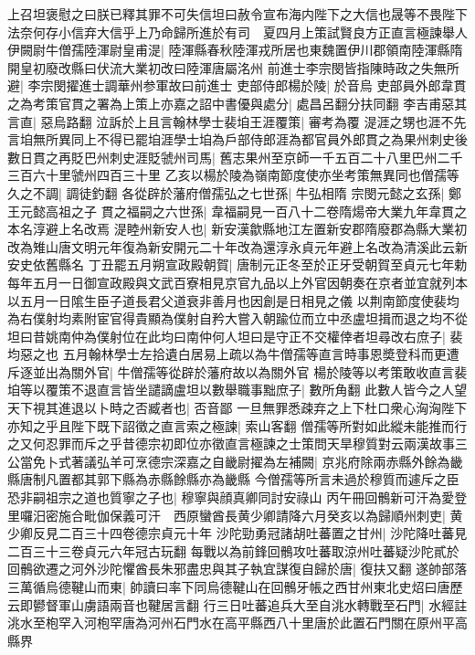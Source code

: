 上召坦褒慰之曰朕已釋其罪不可失信坦曰赦令宣布海内陛下之大信也晟等不畏陛下法奈何存小信弃大信乎上乃命歸所進於有司　夏四月上策試賢良方正直言極諫舉人伊闕尉牛僧孺陸渾尉皇甫湜|{
	陸渾縣春秋陸渾戎所居也東魏置伊川郡領南陸渾縣隋開皇初廢改縣曰伏流大業初改曰陸渾唐屬洺州}
前進士李宗閔皆指陳時政之失無所避|{
	李宗閔擢進士調華州参軍故曰前進士}
吏部侍郎楊於陵|{
	於音烏}
吏部員外郎韋貫之為考策官貫之署為上策上亦嘉之詔中書優與處分|{
	處昌呂翻分扶同翻}
李吉甫惡其言直|{
	惡烏路翻}
泣訴於上且言翰林學士裴垍王涯覆策|{
	審考為覆}
湜涯之甥也涯不先言垍無所異同上不得已罷垍涯學士垍為戶部侍郎涯為都官員外郎貫之為果州刺史後數日貫之再貶巴州刺史涯貶虢州司馬|{
	舊志果州至京師一千五百二十八里巴州二千三百六十里虢州四百三十里}
乙亥以楊於陵為嶺南節度使亦坐考策無異同也僧孺等久之不調|{
	調徒釣翻}
各從辟於藩府僧孺弘之七世孫|{
	牛弘相隋}
宗閔元懿之玄孫|{
	鄭王元懿高祖之子}
貫之福嗣之六世孫|{
	韋福嗣見一百八十二卷隋煬帝大業九年韋貫之本名淳避上名改焉}
湜睦州新安人也|{
	新安漢歙縣地江左置新安郡隋廢郡為縣大業初改為雉山唐文明元年復為新安開元二十年改為還淳永貞元年避上名改為清溪此云新安史依舊縣名}
丁丑罷五月朔宣政殿朝賀|{
	唐制元正冬至於正牙受朝賀至貞元七年勅每年五月一日御宣政殿與文武百寮相見京官九品以上外官因朝奏在京者並宜就列本以五月一日隂生臣子道長君父道衰非善月也因創是日相見之儀}
以荆南節度使裴均為右僕射均素附宦官得貴顯為僕射自矜大嘗入朝踰位而立中丞盧坦揖而退之均不從坦曰昔姚南仲為僕射位在此均曰南仲何人坦曰是守正不交權倖者坦尋改右庶子|{
	裴均惡之也}
五月翰林學士左拾遺白居易上疏以為牛僧孺等直言時事恩奬登科而更遭斥逐並出為關外官|{
	牛僧孺等從辟於藩府故以為關外官}
楊於陵等以考策敢收直言裴垍等以覆策不退直言皆坐譴謫盧坦以數舉職事黜庶子|{
	數所角翻}
此數人皆今之人望天下視其進退以卜時之否臧者也|{
	否音鄙}
一旦無罪悉疎弃之上下杜口衆心洶洶陛下亦知之乎且陛下既下詔徵之直言索之極諫|{
	索山客翻}
僧孺等所對如此縱未能推而行之又何忍罪而斥之乎昔德宗初即位亦徵直言極諫之士策問天旱穆質對云兩漢故事三公當免卜式著議弘羊可烹德宗深嘉之自畿尉擢為左補闕|{
	京兆府除兩赤縣外餘為畿縣唐制凡置都其郭下縣為赤縣餘縣亦為畿縣}
今僧孺等所言未過於穆質而遽斥之臣恐非嗣祖宗之道也質寧之子也|{
	穆寧與顔真卿同討安祿山}
丙午冊回鶻新可汗為愛登里囉汨密施合毗伽保義可汗　西原蠻酋長黄少卿請降六月癸亥以為歸順州刺吏|{
	黄少卿反見二百三十四卷德宗貞元十年}
沙陀勁勇冠諸胡吐蕃置之甘州|{
	沙陀降吐蕃見二百三十三卷貞元六年冠古玩翻}
每戰以為前鋒回鶻攻吐蕃取涼州吐蕃疑沙陀貳於回鶻欲遷之河外沙陀懼酋長朱邪盡忠與其子執宜謀復自歸於唐|{
	復扶又翻}
遂帥部落三萬循烏德鞬山而東|{
	帥讀曰率下同烏德鞬山在回鶻牙帳之西甘州東北史炤曰唐歷云即鬰督軍山虜語兩音也鞬居言翻}
行三日吐蕃追兵大至自洮水轉戰至石門|{
	水經註洮水至枹罕入河枹罕唐為河州石門水在高平縣西八十里唐於此置石門關在原州平高縣界}
